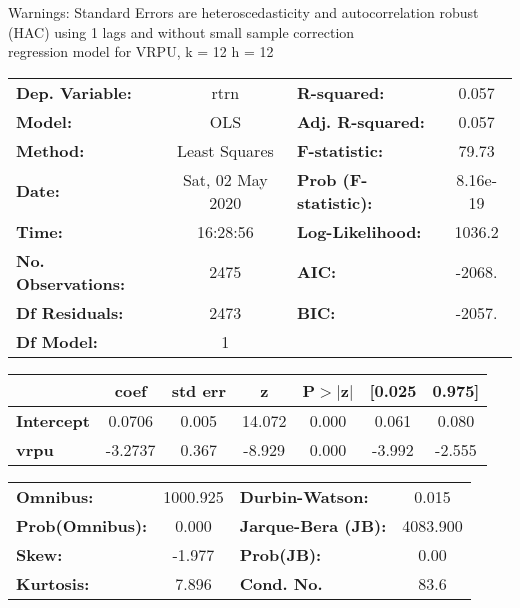 Warnings: \newline
 [1] Standard Errors are heteroscedasticity and autocorrelation robust (HAC) using 1 lags and without small sample correction\\ 

regression model for VRPU, k = 12 h = 12\begin{center}
\begin{tabular}{lclc}
\toprule
\textbf{Dep. Variable:}    &       rtrn       & \textbf{  R-squared:         } &     0.057   \\
\textbf{Model:}            &       OLS        & \textbf{  Adj. R-squared:    } &     0.057   \\
\textbf{Method:}           &  Least Squares   & \textbf{  F-statistic:       } &     79.73   \\
\textbf{Date:}             & Sat, 02 May 2020 & \textbf{  Prob (F-statistic):} &  8.16e-19   \\
\textbf{Time:}             &     16:28:56     & \textbf{  Log-Likelihood:    } &    1036.2   \\
\textbf{No. Observations:} &        2475      & \textbf{  AIC:               } &    -2068.   \\
\textbf{Df Residuals:}     &        2473      & \textbf{  BIC:               } &    -2057.   \\
\textbf{Df Model:}         &           1      & \textbf{                     } &             \\
\bottomrule
\end{tabular}
\begin{tabular}{lcccccc}
                   & \textbf{coef} & \textbf{std err} & \textbf{z} & \textbf{P$> |$z$|$} & \textbf{[0.025} & \textbf{0.975]}  \\
\midrule
\textbf{Intercept} &       0.0706  &        0.005     &    14.072  &         0.000        &        0.061    &        0.080     \\
\textbf{vrpu}      &      -3.2737  &        0.367     &    -8.929  &         0.000        &       -3.992    &       -2.555     \\
\bottomrule
\end{tabular}
\begin{tabular}{lclc}
\textbf{Omnibus:}       & 1000.925 & \textbf{  Durbin-Watson:     } &    0.015  \\
\textbf{Prob(Omnibus):} &   0.000  & \textbf{  Jarque-Bera (JB):  } & 4083.900  \\
\textbf{Skew:}          &  -1.977  & \textbf{  Prob(JB):          } &     0.00  \\
\textbf{Kurtosis:}      &   7.896  & \textbf{  Cond. No.          } &     83.6  \\
\bottomrule
\end{tabular}
\end{center}

